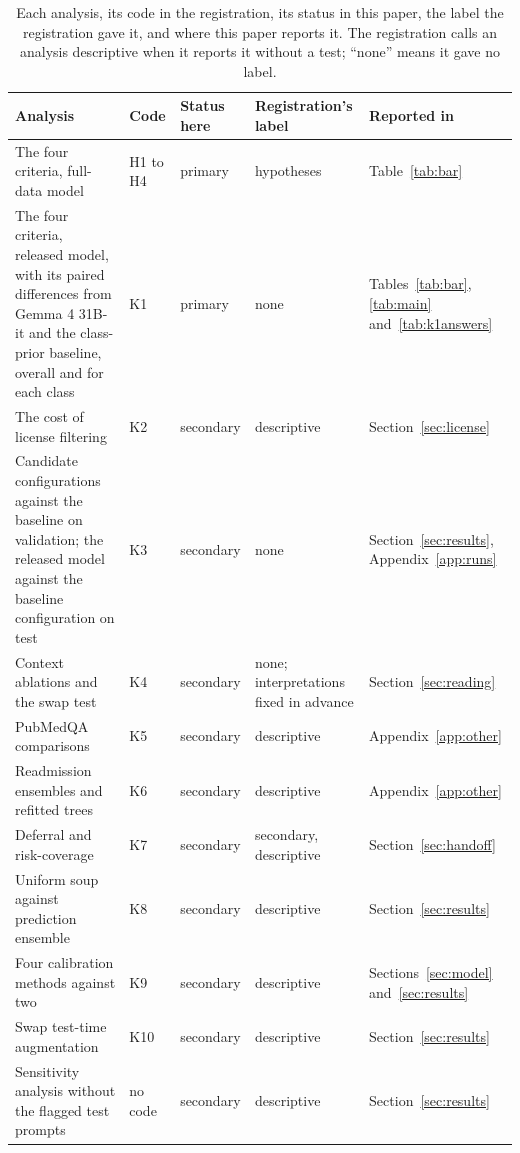 \documentclass[11pt,letterpaper]{article}
\begin{document}
\begin{table}[H]
\centering\footnotesize
\caption{Each analysis, its code in the registration, its status in this paper, the label the registration gave it, and where this paper reports it. The registration calls an analysis descriptive when it reports it without a test; ``none'' means it gave no label.}
\label{tab:analyses}
\setlength{\tabcolsep}{4pt}
\begin{tabular}{>{\raggedright\arraybackslash}p{5.5cm}ll>{\raggedright\arraybackslash}p{2.5cm}>{\raggedright\arraybackslash}p{2.7cm}}
\toprule
Analysis & Code & Status here & Registration's label & Reported in \\
\midrule
The four criteria, full-data model & H1 to H4 & primary & hypotheses & Table~\ref{tab:bar} \\[1pt]
The four criteria, released model, with its paired differences from Gemma 4 31B-it and the class-prior baseline, overall and for each class & K1 & primary & none & Tables~\ref{tab:bar}, \ref{tab:main} and~\ref{tab:k1answers} \\[1pt]
The cost of license filtering & K2 & secondary & descriptive & Section~\ref{sec:license} \\[1pt]
Candidate configurations against the baseline on validation; the released model against the baseline configuration on test & K3 & secondary & none & Section~\ref{sec:results}, Appendix~\ref{app:runs} \\[1pt]
Context ablations and the swap test & K4 & secondary & none; interpretations fixed in advance & Section~\ref{sec:reading} \\[1pt]
PubMedQA comparisons & K5 & secondary & descriptive & Appendix~\ref{app:other} \\[1pt]
Readmission ensembles and refitted trees & K6 & secondary & descriptive & Appendix~\ref{app:other} \\[1pt]
Deferral and risk-coverage & K7 & secondary & secondary, descriptive & Section~\ref{sec:handoff} \\[1pt]
Uniform soup against prediction ensemble & K8 & secondary & descriptive & Section~\ref{sec:results} \\[1pt]
Four calibration methods against two & K9 & secondary & descriptive & Sections~\ref{sec:model} and~\ref{sec:results} \\[1pt]
Swap test-time augmentation & K10 & secondary & descriptive & Section~\ref{sec:results} \\[1pt]
Sensitivity analysis without the flagged test prompts & no code & secondary & descriptive & Section~\ref{sec:results} \\[1pt]

\end{tabular}
\end{table}
\end{document}
